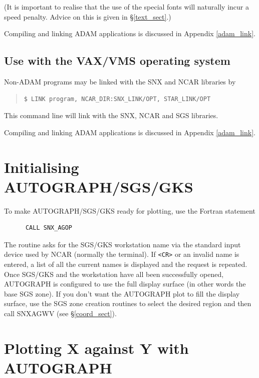 \documentclass[twoside,11pt]{article}
\renewcommand{\_}{\texttt{\symbol{95}}}
\begin{document}
(It is important to realise that the use of the special fonts will naturally
incur a speed penalty.  Advice on this is given in \S\ref{text_sect}.)

Compiling and linking ADAM applications is discussed in Appendix
\ref{adam_link}.

\subsection {Use with the VAX/VMS operating system}

Non-ADAM programs may be linked with the SNX and NCAR libraries by

\begin{quote}
\begin{verbatim}
$ LINK program, NCAR_DIR:SNX_LINK/OPT, STAR_LINK/OPT
\end{verbatim}
\end{quote}

This command line will link with the SNX, NCAR and SGS libraries.

Compiling and linking ADAM applications is discussed in Appendix
\ref{adam_link}.

\section {Initialising AUTOGRAPH/SGS/GKS}

To make AUTOGRAPH/SGS/GKS ready for plotting, use the Fortran statement

\begin{verbatim}
      CALL SNX_AGOP
\end{verbatim}

The routine asks for the SGS/GKS workstation name via the standard input device
used by NCAR (normally the terminal).
If \verb+<CR>+ or an invalid name is entered, a list of all the current names
is displayed and the request is repeated.
Once SGS/GKS and the workstation have all been successfully opened,
AUTOGRAPH is configured to use the full display surface (in other words
the base SGS zone).
If you don't want the AUTOGRAPH plot to fill the display surface, use the SGS
zone creation routines to select the desired region and then call SNX\_AGWV
(see \S\ref{coord_sect}).


\section {Plotting X against Y with AUTOGRAPH}
\end{document}
